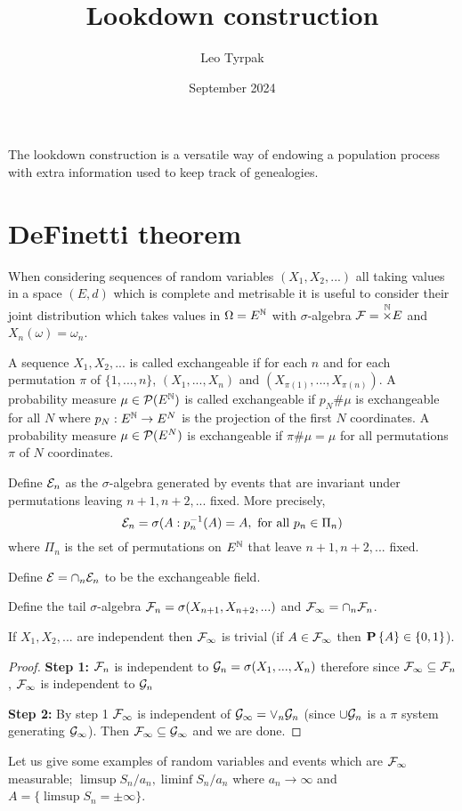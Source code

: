 \documentclass{article}
\title{Lookdown construction}
\author{Leo Tyrpak}
\date{September 2024}
\begin{document}
\maketitle
The lookdown construction is a versatile way of endowing a population process with extra information used to keep track of genealogies.
\section{DeFinetti theorem}
When considering sequences of random variables $(X_1,X_2,...)$ all taking values in a space $(E,d)$ which is complete and metrisable it is useful to consider their joint distribution which takes values in $\Omega=E^{{\mathbb N}}$ with $\sigma$-algebra $\mathcal F=\overset{{\mathbb N}}{\times}E$ and $X_n(\omega)=\omega_n$.
\begin{dfn}
    A sequence $X_1,X_2,...$ is called exchangeable if for each $n$ and for each permutation $\pi$ of $\{1,...,n\}$, $(X_1,...,X_n)$ and $(X_{\pi(1)},...,X_{\pi(n)})$.
    A probability measure $\mu\in\mathcal P(E^{{\mathbb N}})$ is called exchangeable if $p_N\#\mu$ is exchangeable for all $N$ where $p_N:E^{{\mathbb N}}\rightarrow E^N$ is the projection of the first $N$ coordinates.
    A probability measure $\mu\in\mathcal P(E^N)$ is exchangeable if $\pi\#\mu=\mu$ for all permutations $\pi$ of $N$ coordinates.
\end{dfn}

\begin{dfn}
    Define $\mathcal E_n$ as the $\sigma$-algebra generated by events that are invariant under permutations leaving $n+1,n+2,...$ fixed.
    More precisely,
    \begin{equation}
        \mathcal E_n=\sigma(A:p_n^{-1}(A)=A,\text{ for all }p_n\in\Pi_n)
    \end{equation}
    where $\Pi_n$ is the set of permutations on $E^{{\mathbb N}}$ that leave $n+1,n+2,...$ fixed.
    
    Define $\mathcal E=\cap_n\mathcal E_n$ to be the exchangeable field.
\end{dfn}
\begin{dfn}
    Define the tail $\sigma$-algebra $\mathcal F_n=\sigma(X_{n+1},X_{n+2},...)$ and $\mathcal F_\infty=\cap_n\mathcal F_n$.
\end{dfn}
\begin{thm}\label{thm:kolmogorov01}
    If $X_1,X_2,...$ are independent then $\mathcal F_\infty$ is trivial (if $A\in\mathcal F_\infty$ then ${\mathbf P}\left\{A\right\}\in\{0,1\}$).
\end{thm}
\begin{proof}
    \textbf{Step 1:} $\mathcal F_n$ is independent to $\mathcal G_n=\sigma(X_1,...,X_n)$ therefore since $\mathcal F_\infty\subseteq\mathcal F_n$, $\mathcal F_\infty$ is independent to $\mathcal G_n$

    \textbf{Step 2:} By step 1 $\mathcal F_\infty$ is independent of $\mathcal G_\infty=\vee_n\mathcal G_n$ (since $\cup\mathcal G_n$ is a $\pi$ system generating $\mathcal G_\infty$).
    Then $\mathcal F_\infty\subseteq\mathcal G_\infty$ and we are done.
\end{proof}
Let us give some examples of random variables and events which are $\mathcal F_\infty$ measurable; $\limsup{S_n/a_n},\liminf{S_n/a_n}$ where $a_n\rightarrow\infty$ and $A=\{\limsup S_n=\pm \infty\}$.
\end{document}
